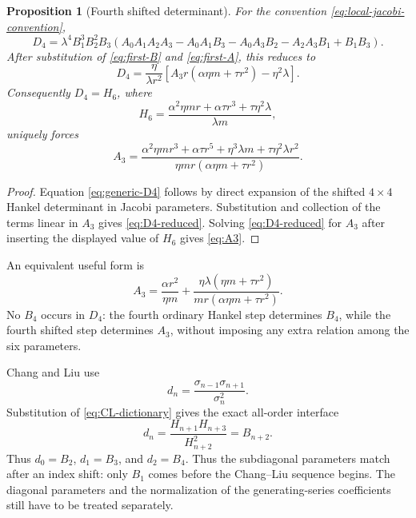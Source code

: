 \documentclass[11pt]{article}
\newtheorem{proposition}[theorem]{Proposition}
\theoremstyle{definition}
\theoremstyle{remark}
\begin{document}
\begin{proposition}[Fourth shifted determinant]
For the convention \eqref{eq:local-jacobi-convention},
\begin{equation}
 D_4=\lambda^4B_1^3B_2^2B_3
 \left(A_0A_1A_2A_3-A_0A_1B_3-A_0A_3B_2-A_2A_3B_1+B_1B_3\right).
 \label{eq:generic-D4}
\end{equation}
After substitution of \eqref{eq:first-B} and \eqref{eq:first-A}, this reduces to
\begin{equation}
 D_4=\frac{\eta}{\lambda r^2}
 \left[A_3r(\alpha\eta m+\tau r^2)-\eta^2\lambda\right].
 \label{eq:D4-reduced}
\end{equation}
Consequently $D_4=H_6$, where
\[
 H_6=\frac{\alpha^2\eta mr+\alpha\tau r^3+\tau\eta^2\lambda}{\lambda m},
\]
uniquely forces
\begin{equation}
 A_3=
 \frac{\alpha^2\eta mr^3+\alpha\tau r^5+\eta^3\lambda m+\tau\eta^2\lambda r^2}
 {\eta mr(\alpha\eta m+\tau r^2)}.
 \label{eq:A3}
\end{equation}
\end{proposition}
\begin{proof}
Equation \eqref{eq:generic-D4} follows by direct expansion of the shifted $4\times4$ Hankel determinant in Jacobi parameters.  Substitution and collection of the terms linear in $A_3$ gives \eqref{eq:D4-reduced}.  Solving \eqref{eq:D4-reduced} for $A_3$ after inserting the displayed value of $H_6$ gives \eqref{eq:A3}.
\end{proof}
An equivalent useful form is
\[
 A_3=\frac{\alpha r^2}{\eta m}+
 \frac{\eta\lambda(\eta m+\tau r^2)}{mr(\alpha\eta m+\tau r^2)}.
\]
No $B_4$ occurs in $D_4$: the fourth ordinary Hankel step determines $B_4$, while the fourth shifted step determines $A_3$, without imposing any extra relation among the six parameters.

Chang and Liu use
\[
 d_n=\frac{\sigma_{n-1}\sigma_{n+1}}{\sigma_n^2}.
\]
Substitution of \eqref{eq:CL-dictionary} gives the exact all-order interface
\begin{equation}
 d_n=\frac{H_{n+1}H_{n+3}}{H_{n+2}^2}=B_{n+2}.
 \label{eq:d-B}
\end{equation}
Thus $d_0=B_2$, $d_1=B_3$, and $d_2=B_4$.  Thus the subdiagonal parameters match after an index shift: only $B_1$ comes before the Chang--Liu sequence begins.  The diagonal parameters and the normalization of the generating-series coefficients still have to be treated separately.
\end{document}
